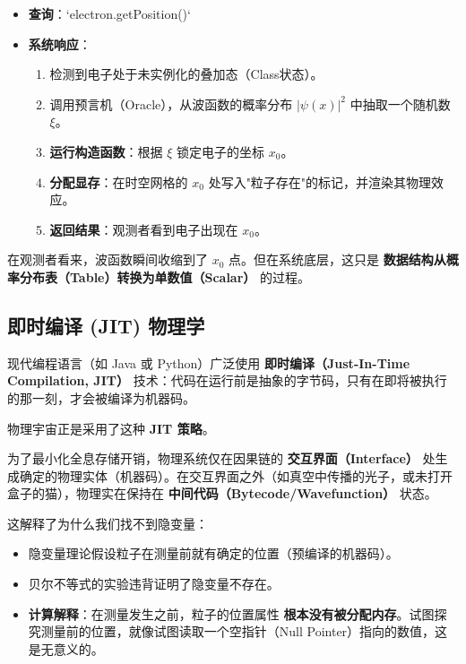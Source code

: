 \begin{itemize}
\item \textbf{查询}：`electron.getPosition()`

\item \textbf{系统响应}：

  \begin{enumerate}
  \item 检测到电子处于未实例化的叠加态（Class状态）。

  \item 调用预言机（Oracle），从波函数的概率分布 $|\psi(x)|^2$ 中抽取一个随机数 $\xi$。

  \item \textbf{运行构造函数}：根据 $\xi$ 锁定电子的坐标 $x_0$。

  \item \textbf{分配显存}：在时空网格的 $x_0$ 处写入"粒子存在"的标记，并渲染其物理效应。

  \item \textbf{返回结果}：观测者看到电子出现在 $x_0$。
  \end{enumerate}
\end{itemize}

在观测者看来，波函数瞬间收缩到了 $x_0$ 点。但在系统底层，这只是 \textbf{数据结构从概率分布表（Table）转换为单数值（Scalar）} 的过程。

\subsection{即时编译 (JIT) 物理学}

现代编程语言（如 Java 或 Python）广泛使用 \textbf{即时编译（Just-In-Time Compilation, JIT）} 技术：代码在运行前是抽象的字节码，只有在即将被执行的那一刻，才会被编译为机器码。

物理宇宙正是采用了这种 \textbf{JIT 策略}。

\begin{theorem}
为了最小化全息存储开销，物理系统仅在因果链的 \textbf{交互界面（Interface）} 处生成确定的物理实体（机器码）。在交互界面之外（如真空中传播的光子，或未打开盒子的猫），物理实在保持在 \textbf{中间代码（Bytecode/Wavefunction）} 状态。
\end{theorem}

这解释了为什么我们找不到隐变量：

\begin{itemize}
\item 隐变量理论假设粒子在测量前就有确定的位置（预编译的机器码）。

\item 贝尔不等式的实验违背证明了隐变量不存在。

\item \textbf{计算解释}：在测量发生之前，粒子的位置属性 \textbf{根本没有被分配内存}。试图探究测量前的位置，就像试图读取一个空指针（Null Pointer）指向的数值，这是无意义的。
\end{itemize}

